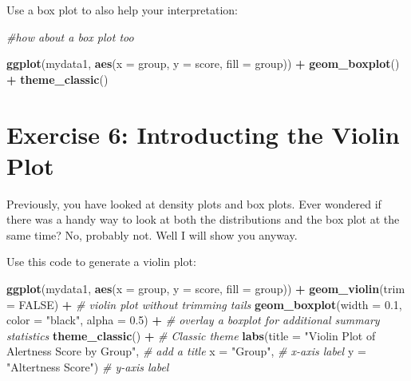 \documentclass[
]{book}
\newenvironment{Shaded}{\begin{snugshade}}{\end{snugshade}}
\newcommand{\AttributeTok}[1]{\textcolor[rgb]{0.13,0.29,0.53}{#1}}
\newcommand{\CommentTok}[1]{\textcolor[rgb]{0.56,0.35,0.01}{\textit{#1}}}
\newcommand{\ConstantTok}[1]{\textcolor[rgb]{0.56,0.35,0.01}{#1}}
\newcommand{\FloatTok}[1]{\textcolor[rgb]{0.00,0.00,0.81}{#1}}
\newcommand{\FunctionTok}[1]{\textcolor[rgb]{0.13,0.29,0.53}{\textbf{#1}}}
\newcommand{\NormalTok}[1]{#1}
\newcommand{\SpecialCharTok}[1]{\textcolor[rgb]{0.81,0.36,0.00}{\textbf{#1}}}
\newcommand{\StringTok}[1]{\textcolor[rgb]{0.31,0.60,0.02}{#1}}
\let\oldsection\section
\renewcommand{\section}{\needspace{5\baselineskip}\oldsection}
\begin{document}
Use a box plot to also help your interpretation:

\begin{Shaded}
\begin{Highlighting}[]
\CommentTok{\#how about a box plot too}

\FunctionTok{ggplot}\NormalTok{(mydata1, }\FunctionTok{aes}\NormalTok{(}\AttributeTok{x =}\NormalTok{ group, }\AttributeTok{y =}\NormalTok{ score, }\AttributeTok{fill =}\NormalTok{ group)) }\SpecialCharTok{+}
  \FunctionTok{geom\_boxplot}\NormalTok{() }\SpecialCharTok{+}
  \FunctionTok{theme\_classic}\NormalTok{()}
\end{Highlighting}
\end{Shaded}

\section{Exercise 6: Introducting the Violin Plot}\label{exercise-6-introducting-the-violin-plot}

Previously, you have looked at density plots and box plots. Ever wondered if there was a handy way to look at both the distributions and the box plot at the same time? No, probably not. Well I will show you anyway.

Use this code to generate a violin plot:

\begin{Shaded}
\begin{Highlighting}[]
\FunctionTok{ggplot}\NormalTok{(mydata1, }\FunctionTok{aes}\NormalTok{(}\AttributeTok{x =}\NormalTok{ group, }\AttributeTok{y =}\NormalTok{ score, }\AttributeTok{fill =}\NormalTok{ group)) }\SpecialCharTok{+}
  \FunctionTok{geom\_violin}\NormalTok{(}\AttributeTok{trim =} \ConstantTok{FALSE}\NormalTok{) }\SpecialCharTok{+}  \CommentTok{\# violin plot without trimming tails}
  \FunctionTok{geom\_boxplot}\NormalTok{(}\AttributeTok{width =} \FloatTok{0.1}\NormalTok{, }\AttributeTok{color =} \StringTok{"black"}\NormalTok{, }\AttributeTok{alpha =} \FloatTok{0.5}\NormalTok{) }\SpecialCharTok{+}  \CommentTok{\# overlay a boxplot for additional summary statistics}
  \FunctionTok{theme\_classic}\NormalTok{() }\SpecialCharTok{+}  \CommentTok{\# Classic theme}
  \FunctionTok{labs}\NormalTok{(}\AttributeTok{title =} \StringTok{"Violin Plot of Alertness Score by Group"}\NormalTok{,  }\CommentTok{\# add a title}
       \AttributeTok{x =} \StringTok{"Group"}\NormalTok{,  }\CommentTok{\# x{-}axis label}
       \AttributeTok{y =} \StringTok{"Altertness Score"}\NormalTok{)  }\CommentTok{\# y{-}axis label}
\end{Highlighting}
\end{Shaded}
\end{document}
